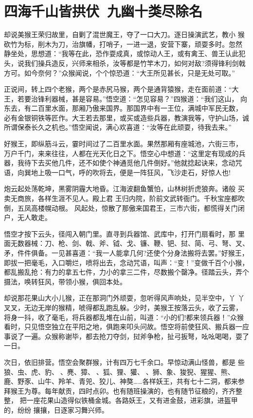 \chapter{四海千山皆拱伏~九幽十类尽除名}

却说美猴王荣归故里，自剿了混世魔王，夺了一口大刀。逐日操演武艺，教小
猴砍竹为标，削木为刀，治旗幡，打哨子，一进一退，安营下寨，顽耍多时。忽然
静坐处，思想道：“我等在此，恐作耍成真，或惊动人王，或有禽王、兽王认此犯
头，说我们操兵造反，兴师来相杀，汝等都是竹竿木刀，如何对敌?须得锋利剑戟
方可。如今奈何？”众猴闻说，个个惊恐道：“大王所见甚长，只是无处可取。”

正说间，转上四个老猴，两个是赤尻马猴，两个是通背猿猴，走在面前道：“大
王，若要治锋利器械，甚是容易。”悟空道：“怎见容易？”四猴道：“我们这山，
向东去，有二百里水面，那厢乃傲来国界。那国界中有一王位，满城中军民无数，
必有金银铜铁等匠作。大王若去那里，或买或造些兵器，教演我等，守护山场，诚
所谓保泰长久之机也。”悟空闻说，满心欢喜道：“汝等在此顽耍，待我去来。”

好猴王，即纵筋斗云，霎时间过了二百里水面。果然那厢有座城池，六街三市，
万户千门，来来往往，人都在光天化日之下。悟空心中想道：“这里定有现成的兵
器，我待下去买他几件，还不如使个神通觅他几件倒好。”他就捻起诀来，念动咒
语，向巽地上吸一口气，呼的吹将去，便是一阵狂风，飞沙走石，好惊人也!

炮云起处荡乾坤，黑雾阴霾大地昏。江海波翻鱼蟹怕，山林树折虎狼奔。诸般
买卖无商旅，各样生涯不见人。殿上君
王归内院，阶前文武转衙门。千秋宝座都吹倒，五凤高楼幌动根。
风起处，惊散了那傲来国君王，三市六街，都慌得关门闭户，无人敢走。

悟空才按下云头，径闯入朝门里。直寻到兵器馆、武库中，打开门扇看时，那
里面无数器械：刀、枪、剑、戟、斧、钺、戈、镰、鞭、钯、挝、简、弓、弩、叉、
矛，件件俱备。一见甚喜道：“我一人能拿几何?还使个分身法搬将去罢。”好猴王，
即拔一把毫毛，入口嚼烂，喷将出去，念动咒语，叫声：“变！”变做千百个小猴，
都乱搬乱抢：有力的拿五七件，力小的拿三二件，尽数搬个罄净。径踏云头，弄个
摄法，唤转狂风，带领小猴，俱回本处。

却说那花果山大小儿猴，正在那洞门外顽耍，忽听得风声响处，见半空中，丫
丫叉叉，无边无岸的猴精，唬得都乱跑乱躲。少时，美猴王按落云头，收了云雾，
将身一抖，收了毫毛，将兵器都乱堆在山前，叫道：“小的们!都来领兵器！”众猴
看时，只见悟空独立在平阳之地，俱跑来叩头问故。悟空将前使狂风、搬兵器一应
事说了一遍。众猴称谢毕，都去抢刀夺剑，挝斧争枪，扯弓扳弩，吆吆喝喝，耍了
一日。

次日，依旧排营。悟空会聚群猴，计有四万七千余口。早惊动满山怪兽，都是
些狼、虫、虎、豹、、麂、獐、、狐、狸、獾、、狮、象、狻猊、猩猩、熊、
鹿、野豕、山牛、羚羊、青兕、狡儿、神獒……各样妖王，共有七十二洞，都来参
拜猴王为尊。每年献贡，四时点卯。也有随班操演的，也有随节征粮的，齐齐整整，
把一座花果山造得似铁桶金城。各路妖王，又有进金鼓，进彩旗，进盔甲的，纷纷
攘攘，日逐家习舞兴师。


